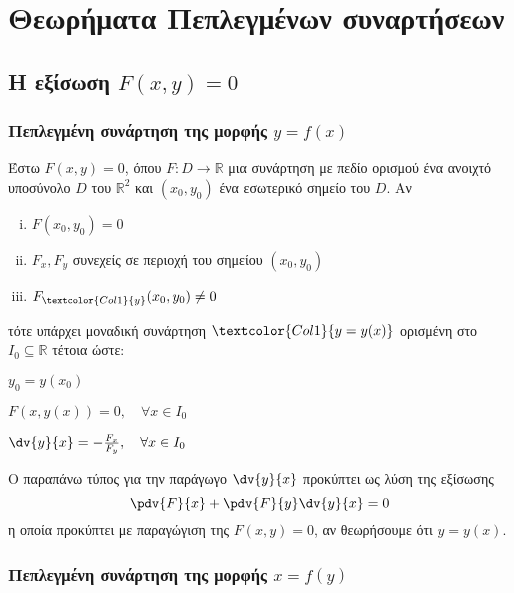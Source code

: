 \section{Θεωρήματα Πεπλεγμένων συναρτήσεων}

\vspace{\baselineskip}

\subsection{Η εξίσωση \ensuremath{F(x,y) = 0}}

\subsubsection{Πεπλεγμένη συνάρτηση της μορφής \ensuremath{y=f(x)}}

Έστω $ F(x,y) = 0 $, όπου $ F\colon D \to \mathbb{R} $ μια συνάρτηση με πεδίο
ορισμού ένα ανοιχτό υποσύνολο $D$ του $\mathbb{R}^{2}$ και $ (x_0,y_0) $ ένα 
εσωτερικό σημείο του $D$.  Αν 
\begin{enumerate}[(i)]
  \item $F(x_0,y_0) = 0$ 
  \item $ F_x, F_y$ συνεχείς σε περιοχή του σημείου $ (x_0,y_0) $ 
  \item $ F_{\textcolor{Col1}{y}}(x_0,y_0) \neq 0 $
\end{enumerate}
τότε υπάρχει μοναδική συνάρτηση $\textcolor{Col1}{y=y(x)} $ ορισμένη στο 
$ I_0 \subseteq \mathbb{R} $ τέτοια ώστε:
\begin{myitemize}
  \item $y_0 = y(x_0)$
  \item $F(x,y(x)) = 0, \quad \forall x \in I_0$
  \item $ \dv{y}{x} = - \frac{F_x}{F_y}, \quad \forall x \in I_0  $
\end{myitemize}

\begin{rem}
  Ο παραπάνω τύπος για την παράγωγο $ \dv{y}{x} $ προκύπτει ως λύση της εξίσωσης
  \[
    \pdv{F}{x} + \pdv{F}{y}\dv{y}{x} = 0 
  \] 
  η οποία προκύπτει με παραγώγιση της $ F(x,y) = 0$, αν θεωρήσουμε ότι $ y=y(x) $.
\end{rem}

\subsubsection{Πεπλεγμένη συνάρτηση της μορφής \ensuremath{x=f(y)}}

